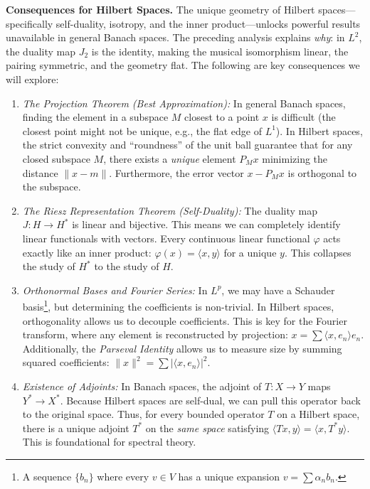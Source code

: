\documentclass{article}
\let\temp\phi
\let\phi\varphi
\let\varphi\temp
\begin{document}
\medskip\noindent\textbf{Consequences for Hilbert Spaces.}\quad
The unique geometry of Hilbert spaces---specifically self-duality, isotropy, and the inner product---unlocks
powerful results unavailable in general Banach spaces. The preceding analysis explains \emph{why}: in $L^2$,
the duality map $J_2$ is the identity, making the musical isomorphism linear, the pairing symmetric, and the
geometry flat. The following are key consequences we will explore:

\begin{enumerate}
    \item \emph{The Projection Theorem (Best Approximation):}
    In general Banach spaces, finding the element in a subspace $M$ closest to a point $x$ is difficult (the
    closest point might not be unique, e.g., the flat edge of $L^1$). In Hilbert spaces, the strict convexity and ``roundness'' of the unit ball guarantee that for any closed subspace $M$, there exists a \emph{unique} element $P_M x$ minimizing the distance $\|x - m\|$. Furthermore, the error vector $x - P_M x$ is orthogonal to the subspace.

    \item \emph{The Riesz Representation Theorem (Self-Duality):}
    The duality map $J: H \to H^*$ is linear and bijective. This means we can completely identify linear functionals with vectors. Every continuous linear functional $\phi$ acts exactly like an inner product: $\phi(x) = \langle x, y \rangle$ for a unique $y$. This collapses the study of $H^*$ to the study of $H$.

	\item \emph{Orthonormal Bases and Fourier Series:} In $L^p$, we may have a Schauder basis\footnote{A sequence $\{b_n\}$ where every $v \in V$ has a unique expansion $v = \sum \alpha_nb_n$.}, but determining the coefficients is non-trivial. In Hilbert spaces, orthogonality allows us to decouple coefficients. This is key for the Fourier transform, where any element is reconstructed by projection: $x = \sum \langle x, e_n \rangle e_n$. Additionally, the \emph{Parseval Identity} allows us to measure size by summing squared coefficients: $\|x\|^2 = \sum |\langle x, e_n \rangle|^2$.

    \item \emph{Existence of Adjoints:}
    In Banach spaces, the adjoint of $T: X \to Y$ maps $Y^* \to X^*$. Because Hilbert spaces are self-dual, we can pull this operator back to the original space. Thus, for every bounded operator $T$ on a Hilbert space, there is a unique adjoint $T^*$ on the \emph{same space} satisfying $\langle Tx, y \rangle = \langle x, T^* y \rangle$. This is foundational for spectral theory.
\end{enumerate}
\end{document}
